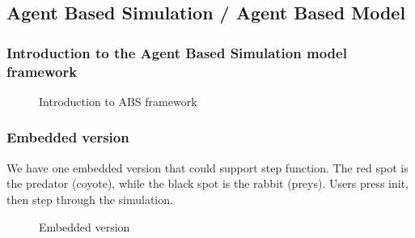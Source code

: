\documentclass{article}
\begin{document}
\begin{normalsize}
\subsection{Agent Based Simulation / Agent Based Model}
\subsubsection{Introduction to the Agent Based Simulation model framework}
\begin{figure}[H]
	\caption{Introduction to ABS framework}
\end{figure}
\subsubsection{Embedded version}
We have one embedded version that could support step function. The red spot is the predator (coyote), while the black spot is the rabbit (preys). Users press init, then step through the simulation.
\begin{figure}[H]
	\caption{Embedded version}
	\end{figure}

\end{normalsize}
\end{document}
